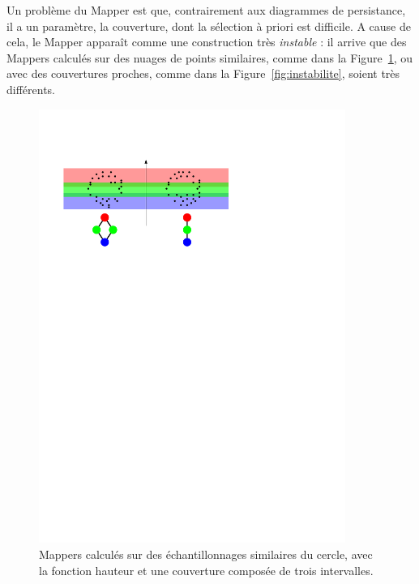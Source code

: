 Un probl\`eme du Mapper est que, contrairement aux diagrammes de persistance, il a un param\`etre, la couverture,
dont la s\'election \`a priori est difficile. A cause de cela, le Mapper appara\^it comme une construction tr\`es {\em instable} : 
il arrive que des Mappers calcul\'es sur des nuages de points similaires, comme dans la Figure~\ref{fig:instabiliteMapper},
ou avec des couvertures proches, comme dans la Figure~\ref{fig:instabilite}, soient tr\`es diff\'erents.


\begin{figure}[h]\centering
\includegraphics[width=10cm]{figures/ExampleInstabilityMapper}
\caption[Instabilit\'e de Mappers calcul\'es sur des espaces proches]{\label{fig:instabiliteMapper} 
Mappers calcul\'es sur des \'echantillonnages similaires du cercle, avec la fonction hauteur et une couverture  compos\'ee de trois intervalles.}
\end{figure}


